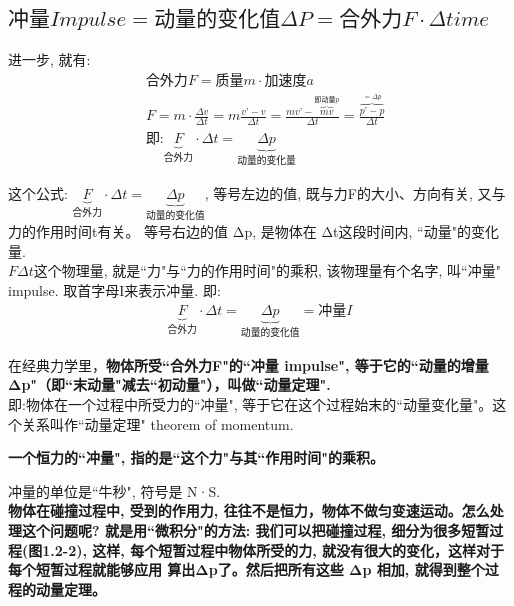 \documentclass[UTF8]{ctexart}
\begin{document}
\vspace{1em} 


\subsection{$\text{冲量}Impulse=\text{动量的变化值}\varDelta P=\text{合外力}F\cdot \varDelta time$}

进一步, 就有: 
\begin{align*}
		& \text{合外力}F=\text{质量}m\cdot \text{加速度}a\\
	& F=m\cdot \frac{\varDelta v}{\varDelta t}=m\frac{v-v}{\varDelta t}=\frac{mv-\overset{\text{即动量}p}{\overbrace{mv}}}{\varDelta t}=\frac{\overset{=\varDelta p}{\overbrace{p-p}}}{\varDelta t}\\
	& \text{即:}\underset{\text{合外力}}{\underbrace{F}}\cdot \varDelta t=\underset{\text{动量的变化量}}{\underbrace{\varDelta p}}
\end{align*}

这个公式: $\underset{\text{合外力}}{\underbrace{F}}\cdot \varDelta t=\underset{\text{动量的变化值}}{\underbrace{\varDelta p}}$, 等号左边的值, 既与力F的大小、方向有关, 又与力的作用时间t有关。 等号右边的值 Δp, 是物体在 Δt这段时间内, ``动量"的变化量. \\
$FΔt$这个物理量, 就是``力"与``力的作用时间"的乘积, 该物理量有个名字, 叫``冲量" impulse. 取首字母I来表示冲量. 即:  \\
\begin{align*}
	\boxed{
	\underset{\text{合外力}}{\underbrace{F}}\cdot \varDelta t=\underset{\text{动量的变化值}}{\underbrace{\varDelta p}}=\text{冲量}I	
	}
\end{align*}

在经典力学里，\textbf{物体所受``合外力F"的``冲量 impulse", 等于它的``动量的增量 Δp"（即``末动量"减去``初动量"），叫做``动量定理".}\\
即:物体在一个过程中所受力的``冲量", 等于它在这个过程始末的``动量变化量"。这个关系叫作``动量定理" theorem of momentum.

\textbf{一个恒力的``冲量", 指的是``这个力"与其``作用时间"的乘积。}

冲量的单位是``牛秒", 符号是 N·S. \\

\textbf{物体在碰撞过程中, 受到的作用力, 往往不是恒力，物体不做匀变速运动。怎么处理这个问题呢? 就是用``微积分"的方法: 我们可以把碰撞过程, 细分为很多短暂过程(图1.2-2), 这样, 每个短暂过程中物体所受的力, 就没有很大的变化，这样对于每个短暂过程就能够应用 算出Δp了。然后把所有这些 Δp 相加, 就得到整个过程的动量定理。} \\
\end{document}
